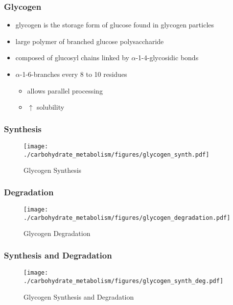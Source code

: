 \documentclass{scrartcl}
\begin{document}
\subsubsection{Glycogen}
\label{sec:orga7d963e}

\begin{itemize}
\item glycogen is the storage form of glucose found in glycogen particles
\item large polymer of branched glucose polysaccharide
\item composed of glucosyl chains linked by \(\alpha\)-1-4-glycosidic bonds
\item \(\alpha\)-1-6-branches every 8 to 10 residues
\begin{itemize}
\item allows parallel processing
\item \(\uparrow\) solubility
\end{itemize}
\end{itemize}

\subsubsection{Synthesis}
\label{sec:org8431074}
\begin{figure}[htbp]
\centering
\texttt{[image: ./carbohydrate\_metabolism/figures/glycogen\_synth.pdf]}
\caption{\label{fig:orgce6ea8e}
Glycogen Synthesis}
\end{figure}

\subsubsection{Degradation}
\label{sec:org04553ab}

\begin{figure}[htbp]
\centering
\texttt{[image: ./carbohydrate\_metabolism/figures/glycogen\_degradation.pdf]}
\caption{\label{fig:orgdcc5720}
Glycogen Degradation}
\end{figure}

\subsubsection{Synthesis and Degradation}
\label{sec:orgfa2f429}

\begin{figure}[htbp]
\centering
\texttt{[image: ./carbohydrate\_metabolism/figures/glycogen\_synth\_deg.pdf]}
\caption{\label{fig:org959d891}
Glycogen Synthesis and Degradation}
\end{figure}
\end{document}

